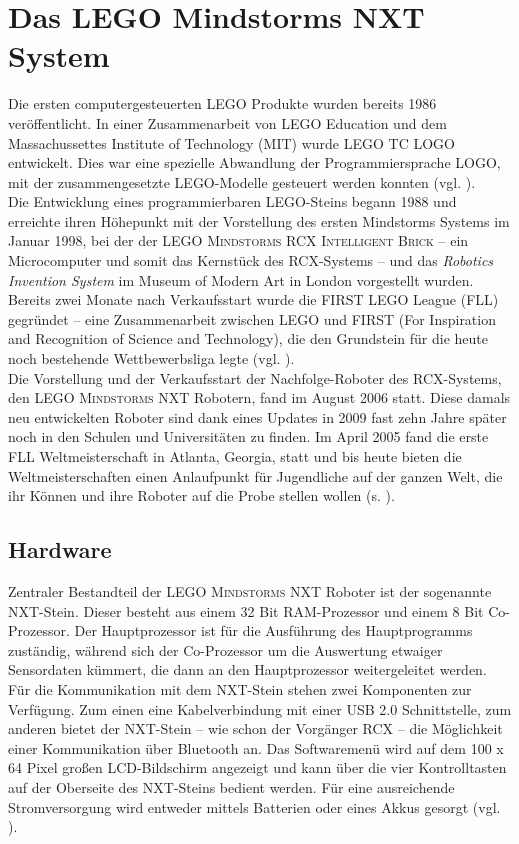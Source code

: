 \documentclass[paper=a4, DIV=calc, BCOR=12mm, twoside=on, onecolumn=on, open = right, titlepage =on, parskip =half-, headsepline = on, footsepline = off, chapterprefix = off, appendixprefix = on, fontsize = 12pt, numbers = noenddot, abstract = on]{scrbook}
\begin{document}
\section{Das LEGO Mindstorms NXT System}
\onehalfspacing
Die ersten computergesteuerten \textsc{LEGO} Produkte wurden bereits 1986 veröffentlicht. In einer Zusammenarbeit von \textsc{LEGO} Education und dem Massachussettes Institute of Technology (MIT) wurde \textsc{LEGO TC LOGO} entwickelt. Dies war eine spezielle Abwandlung der Programmiersprache LOGO, mit der zusammengesetzte \textsc{LEGO}-Modelle gesteuert werden konnten (vgl. \cite{rolling:14}).\\
Die Entwicklung eines programmierbaren \textsc{LEGO}-Steins begann 1988 und erreichte ihren Höhepunkt mit der Vorstellung des ersten Mindstorms Systems im Januar 1998, bei der der \textsc{LEGO Mindstorms RCX Intelligent Brick} -- ein Microcomputer und somit das Kernstück des RCX-Systems -- und das \emph{Robotics Invention System} im Museum of Modern Art in London vorgestellt wurden.\\
Bereits zwei Monate nach Verkaufsstart wurde die FIRST LEGO League (FLL) gegründet -- eine Zusammenarbeit zwischen \textsc{LEGO} und FIRST (For Inspiration and Recognition of Science and Technology), die den Grundstein für die heute noch bestehende Wettbewerbsliga legte (vgl. \cite{rolling:14}).\\
Die Vorstellung und der Verkaufsstart der Nachfolge-Roboter des RCX-Systems, den \textsc{LEGO Mindstorms} NXT Robotern, fand im August 2006 statt. Diese damals neu entwickelten Roboter sind dank eines Updates in 2009 fast zehn Jahre später noch in den Schulen und Universitäten zu finden. Im April 2005 fand die erste FLL Weltmeisterschaft in Atlanta, Georgia, statt und bis heute bieten die Weltmeisterschaften einen Anlaufpunkt für Jugendliche auf der ganzen Welt, die ihr Können und ihre Roboter auf die Probe stellen wollen (s. \cite{lego}).

\par \singlespacing
\subsection{Hardware}
\onehalfspacing
Zentraler Bestandteil der \textsc{LEGO Mindstorms} NXT Roboter ist der sogenannte NXT-Stein. Dieser besteht aus einem 32 Bit RAM-Prozessor und einem 8 Bit Co-Prozessor. Der Hauptprozessor ist für die Ausführung des Hauptprogramms zuständig, während sich der Co-Prozessor um die Auswertung etwaiger Sensordaten kümmert, die dann an den Hauptprozessor weitergeleitet werden. Für die Kommunikation mit dem NXT-Stein stehen zwei Komponenten zur Verfügung. Zum einen eine Kabelverbindung mit einer USB 2.0 Schnittstelle, zum anderen bietet der NXT-Stein -- wie schon der Vorgänger RCX -- die Möglichkeit einer Kommunikation über Bluetooth an. Das Softwaremenü wird auf dem 100 x 64 Pixel großen LCD-Bildschirm angezeigt und kann über die vier Kontrolltasten auf der Oberseite des NXT-Steins bedient werden. Für eine ausreichende Stromversorgung wird entweder mittels Batterien oder eines Akkus gesorgt (vgl. \cite[S.42]{berns:10}).
\end{document}
